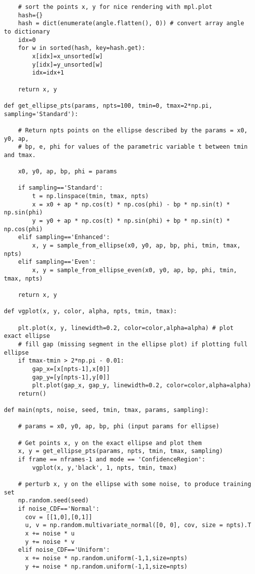\documentclass[oneside,10pt]{book}
\begin{document}
\begin{lstlisting}
    # sort the points x, y for nice rendering with mpl.plot
    hash={}
    hash = dict(enumerate(angle.flatten(), 0)) # convert array angle to dictionary
    idx=0
    for w in sorted(hash, key=hash.get):
        x[idx]=x_unsorted[w]
        y[idx]=y_unsorted[w]
        idx=idx+1

    return x, y

def get_ellipse_pts(params, npts=100, tmin=0, tmax=2*np.pi, sampling='Standard'):

    # Return npts points on the ellipse described by the params = x0, y0, ap,
    # bp, e, phi for values of the parametric variable t between tmin and tmax.

    x0, y0, ap, bp, phi = params

    if sampling=='Standard':
        t = np.linspace(tmin, tmax, npts)
        x = x0 + ap * np.cos(t) * np.cos(phi) - bp * np.sin(t) * np.sin(phi)
        y = y0 + ap * np.cos(t) * np.sin(phi) + bp * np.sin(t) * np.cos(phi)
    elif sampling=='Enhanced':
        x, y = sample_from_ellipse(x0, y0, ap, bp, phi, tmin, tmax, npts)
    elif sampling=='Even':
        x, y = sample_from_ellipse_even(x0, y0, ap, bp, phi, tmin, tmax, npts)

    return x, y

def vgplot(x, y, color, alpha, npts, tmin, tmax):

    plt.plot(x, y, linewidth=0.2, color=color,alpha=alpha) # plot exact ellipse
    # fill gap (missing segment in the ellipse plot) if plotting full ellipse
    if tmax-tmin > 2*np.pi - 0.01:
        gap_x=[x[npts-1],x[0]]
        gap_y=[y[npts-1],y[0]]
        plt.plot(gap_x, gap_y, linewidth=0.2, color=color,alpha=alpha)
    return()

def main(npts, noise, seed, tmin, tmax, params, sampling):

    # params = x0, y0, ap, bp, phi (input params for ellipse)

    # Get points x, y on the exact ellipse and plot them
    x, y = get_ellipse_pts(params, npts, tmin, tmax, sampling)
    if frame == nframes-1 and mode == 'ConfidenceRegion':
        vgplot(x, y,'black', 1, npts, tmin, tmax)

    # perturb x, y on the ellipse with some noise, to produce training set
    np.random.seed(seed)
    if noise_CDF=='Normal':
      cov = [[1,0],[0,1]]
      u, v = np.random.multivariate_normal([0, 0], cov, size = npts).T
      x += noise * u
      y += noise * v
    elif noise_CDF=='Uniform':
      x += noise * np.random.uniform(-1,1,size=npts)
      y += noise * np.random.uniform(-1,1,size=npts)


\end{lstlisting}
\end{document}
